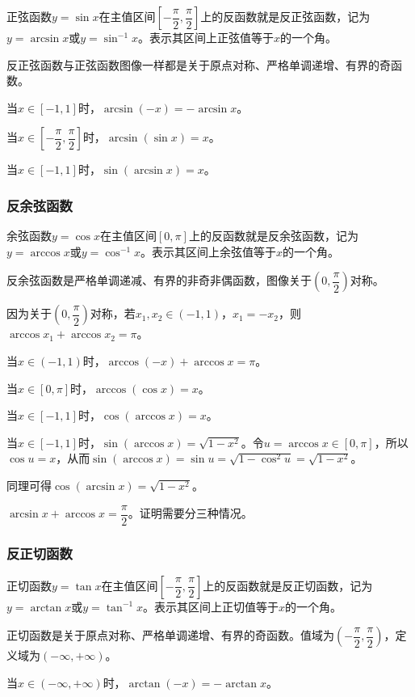 \documentclass[UTF8, 12pt]{ctexart}
\begin{document}
正弦函数$y=\sin x$在主值区间$\left[-\dfrac{\pi}{2},\dfrac{\pi}{2}\right]$上的反函数就是反正弦函数，记为$y=\arcsin x$或$y=\sin^{-1}x$。表示其区间上正弦值等于$x$的一个角。

反正弦函数与正弦函数图像一样都是关于原点对称、严格单调递增、有界的奇函数。

当$x\in[-1,1]$时，$\arcsin(-x)=-\arcsin x$。

当$x\in\left[-\dfrac{\pi}{2},\dfrac{\pi}{2}\right]$时，$\arcsin(\sin x)=x$。

当$x\in[-1,1]$时，$\sin(\arcsin x)=x$。

\subsubsection{反余弦函数}

余弦函数$y=\cos x$在主值区间$[0,\pi]$上的反函数就是反余弦函数，记为$y=\arccos x$或$y=\cos^{-1}x$。表示其区间上余弦值等于$x$的一个角。

反余弦函数是严格单调递减、有界的非奇非偶函数，图像关于$\left(0,\dfrac{\pi}{2}\right)$对称。

因为关于$\left(0,\dfrac{\pi}{2}\right)$对称，若$x_1,x_2\in(-1,1)$，$x_1=-x_2$，则$\arccos x_1+\arccos x_2=\pi$。

当$x\in(-1,1)$时，$\arccos(-x)+\arccos x=\pi$。

当$x\in[0,\pi]$时，$\arccos(\cos x)=x$。

当$x\in[-1,1]$时，$\cos(\arccos x)=x$。

当$x\in[-1,1]$时，$\sin(\arccos x)=\sqrt{1-x^2}$。令$u=\arccos x\in[0,\pi]$，所以$\cos u=x$，从而$\sin(\arccos x)=\sin u=\sqrt{1-\cos^2u}=\sqrt{1-x^2}$。

同理可得$\cos(\arcsin x)=\sqrt{1-x^2}$。

$\arcsin x+\arccos x=\dfrac{\pi}{2}$。证明需要分三种情况。

\subsubsection{反正切函数}

正切函数$y=\tan x$在主值区间$\left[-\dfrac{\pi}{2},\dfrac{\pi}{2}\right]$上的反函数就是反正切函数，记为$y=\arctan x$或$y=\tan^{-1}x$。表示其区间上正切值等于$x$的一个角。

正切函数是关于原点对称、严格单调递增、有界的奇函数。值域为$\left(-\dfrac{\pi}{2},\dfrac{\pi}{2}\right)$，定义域为$(-\infty,+\infty)$。

当$x\in(-\infty,+\infty)$时，$\arctan(-x)=-\arctan x$。
\end{document}
